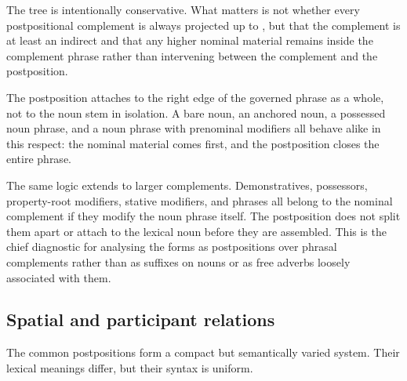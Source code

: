\noindent The tree is intentionally conservative. What matters is not whether
every postpositional complement is always projected up to , but
that the complement is at least an indirect  and that any higher
nominal material remains inside the complement phrase rather than intervening
between the complement and the postposition.

The postposition attaches to the right edge of the governed phrase as a whole,
not to the noun stem in isolation. A bare noun, an anchored noun, a possessed
noun phrase, and a noun phrase with prenominal modifiers all behave alike in
this respect: the nominal material comes first, and the postposition closes the
entire phrase.

\pex
\a {} 
\a {} 
\a {} 
\a {} 
\xe

\noindent The same logic extends to larger complements. Demonstratives,
possessors, property-root modifiers, stative modifiers, and  phrases
all belong to the nominal complement if they modify the noun phrase itself. The
postposition does not split them apart or attach to the lexical noun before they
are assembled. This is the chief diagnostic for analysing the forms as
postpositions over phrasal complements rather than as suffixes on nouns or as
free adverbs loosely associated with them.

\subsection{Spatial and participant relations}
\label{sec:nm-postp-classes}
\label{sec:nm-postp-extended}

The common postpositions form a compact but semantically varied system. Their
lexical meanings differ, but their syntax is uniform.

